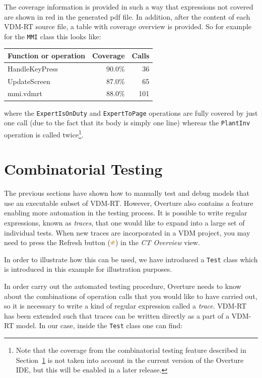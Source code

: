 The coverage information is provided in such a way that expressions not covered 
are shown in red in the generated pdf file. In addition,
after the content of each VDM-RT source file, a table with coverage
overview is provided. So for example for the
\texttt{MMI} class this looks like:

\begin{longtable}{|l|r|r|}
\hline
Function or operation & Coverage & Calls \\
\hline
\hline
HandleKeyPress & 90.0\% & 36 \\
\hline
UpdateScreen & 87.0\% & 65 \\
\hline
\hline
mmi.vdmrt & 88.0\% & 101 \\
\hline
\end{longtable}

\noindent where the \texttt{ExpertIsOnDuty} and \texttt{ExpertToPage}
operations are fully covered by just one call (due to the fact that
its body is simply one line) whereas the \texttt{PlantInv} operation
is called twice\footnote{Note that the coverage from the combinatorial
  testing feature described in Section~\ref{sec:CT} is not taken into
  account in the current version of the Overture IDE, but this will be
  enabled in a later release.}.

\section{Combinatorial Testing}\label{sec:CT}

The previous sections have shown how to manually test and debug models
that use an executable subset of VDM-RT. However, Overture also
contains a feature enabling more automation in the testing process. It
is possible to write regular expressions, known as \emph{traces}, that one
would like to expand into a large set of individual tests. When new
traces are incorporated in a VDM project, you may need to press the
\textsf{Refresh} button
(\includegraphics[width=0.02\textwidth]{figures/refresh}) in the
\emph{CT Overview} view.

In order to illustrate how this can be used, we have introduced a
\texttt{Test} class which is introduced in this example for
illustration purposes.

In order carry out the automated testing procedure, Overture needs to know about the
combinations of operation calls that you would like to have carried
out, so it is necessary to write a kind of regular expression called a
\emph{trace}. VDM-RT has been extended such that traces can be written
directly as a part of a VDM-RT model. In our case, inside the \texttt{Test}
class one can find:

